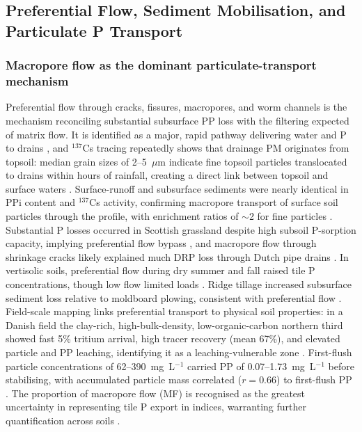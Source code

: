 \documentclass[11pt]{article}
\begin{document}
\subsection{Preferential Flow, Sediment Mobilisation, and Particulate P Transport}

\subsubsection{Macropore flow as the dominant particulate-transport mechanism}

Preferential flow through cracks, fissures, macropores, and worm channels is the
mechanism reconciling substantial subsurface PP loss with the filtering expected of
matrix flow. It is identified as a major, rapid pathway delivering water and P to
drains \parencite{King2015,Sims1998}, and $^{137}$Cs tracing repeatedly shows that
drainage PM originates from topsoil: median grain sizes of 2--5~$\mu$m indicate fine
topsoil particles translocated to drains within hours of rainfall, creating a direct
link between topsoil and surface waters \parencite{Laubel1999}. Surface-runoff and
subsurface sediments were nearly identical in PPi content and $^{137}$Cs activity,
confirming macropore transport of surface soil particles through the profile, with
enrichment ratios of $\sim$2 for fine particles \parencite{Uusitalo2001}. Substantial
P losses occurred in Scottish grassland despite high subsoil P-sorption capacity,
implying preferential flow bypass \parencite{Hooda1999}, and macropore flow through
shrinkage cracks likely explained much DRP loss through Dutch pipe drains
\parencite{vanderSalm2012}. In vertisolic soils, preferential flow during dry summer
and fall raised tile P concentrations, though low flow limited loads
\parencite{Kokulan2021}. Ridge tillage increased subsurface sediment loss relative to
moldboard plowing, consistent with preferential flow \parencite{Zhao2001}. Field-scale
mapping links preferential transport to physical soil properties: in a Danish field
the clay-rich, high-bulk-density, low-organic-carbon northern third showed fast 5\%
tritium arrival, high tracer recovery (mean 67\%), and elevated particle and PP
leaching, identifying it as a leaching-vulnerable zone \parencite{Norgaard2013}.
First-flush particle concentrations of 62--390~mg~L$^{-1}$ carried PP of
0.07--1.73~mg~L$^{-1}$ before stabilising, with accumulated particle mass correlated
($r=0.66$) to first-flush PP \parencite{Norgaard2013}. The proportion of macropore
flow (MF) is recognised as the greatest uncertainty in representing tile P export in
indices, warranting further quantification across soils \parencite{Reid2012}.
\end{document}
